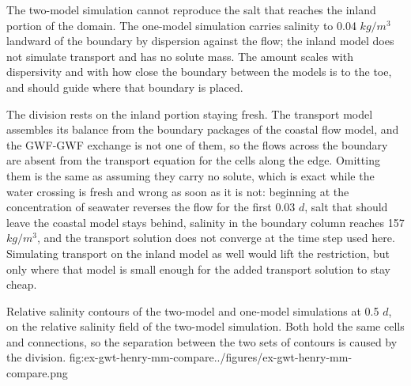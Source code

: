 The two-model simulation cannot reproduce the salt that reaches the inland portion of the domain. The one-model simulation carries salinity to 0.04 $kg/m^3$ landward of the boundary by dispersion against the flow; the inland model does not simulate transport and has no solute mass. The amount scales with dispersivity and with how close the boundary between the models is to the toe, and should guide where that boundary is placed.

The division rests on the inland portion staying fresh. The transport model assembles its balance from the boundary packages of the coastal flow model, and the GWF-GWF exchange is not one of them, so the flows across the boundary are absent from the transport equation for the cells along the edge. Omitting them is the same as assuming they carry no solute, which is exact while the water crossing is fresh and wrong as soon as it is not: beginning at the concentration of seawater reverses the flow for the first 0.03 $d$, salt that should leave the coastal model stays behind, salinity in the boundary column reaches 157 $kg/m^3$, and the transport solution does not converge at the time step used here. Simulating transport on the inland model as well would lift the restriction, but only where that model is small enough for the added transport solution to stay cheap.

\begin{StandardFigure}{
    Relative salinity contours of the two-model and one-model simulations at 0.5 $d$,
    on the relative salinity field of the two-model simulation. Both hold the same
    cells and connections, so the separation between the two sets of contours is caused
    by the division.
    }{fig:ex-gwt-henry-mm-compare}{../figures/ex-gwt-henry-mm-compare.png}
\end{StandardFigure}

